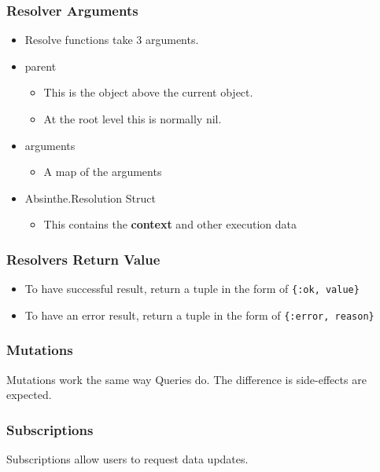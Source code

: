 \documentclass{beamer}
\begin{document}
\begin{frame}
  \frametitle{Resolver Arguments}

  \begin{itemize}
  \item{Resolve functions take 3 arguments.} \pause
  \item{parent}
    \begin{itemize}
    \item{This is the object above the current object.}
    \item{At the root level this is normally nil.}\pause
    \end{itemize}
  \item{arguments} \pause
    \begin{itemize}
      \item{A map of the arguments} \pause
    \end{itemize}
  \item{Absinthe.Resolution Struct} \pause
    \begin{itemize}
      \item{This contains the \textbf{context} and other execution data}
    \end{itemize}
  \end{itemize}

\end{frame}

\begin{frame}
  \frametitle{Resolvers Return Value}

  \begin{itemize}
    \item{To have \alert{successful} result, return a tuple in the form of \texttt{\{:ok, value\}}}
    \item{To have an \alert{error} result, return a tuple in the form of \texttt{\{:error, reason\}}}
  \end{itemize}

\end{frame}

\begin{frame}
\frametitle{Mutations}

Mutations work the same way Queries do. The difference is side-effects are expected.
\Mut
\end{frame}

\begin{frame}
\frametitle{Subscriptions}

Subscriptions allow users to request data updates.

\Sub
\end{frame}
\end{document}
